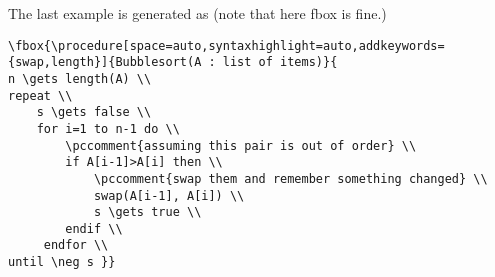 \documentclass[a4paper]{report}
\begin{document}
The last example is generated as (note that here fbox is fine.)
\begin{lstlisting}
\fbox{\procedure[space=auto,syntaxhighlight=auto,addkeywords={swap,length}]{Bubblesort(A : list of items)}{
n \gets length(A) \\
repeat \\
    s \gets false \\
    for i=1 to n-1 do \\
        \pccomment{assuming this pair is out of order} \\
        if A[i-1]>A[i] then \\
            \pccomment{swap them and remember something changed} \\
            swap(A[i-1], A[i]) \\
            s \gets true \\
        endif \\
     endfor \\
until \neg s }}
\end{lstlisting}
\end{document}
